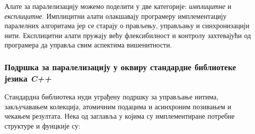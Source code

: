 \documentclass[12pt,oneside]{memoir}
\begin{document}
 Алате за паралелизацију можемо поделити у две категорије: \textit{имплицитне} и \textit{експлицитне}. Имплицитни алати олакшавају програмеру имплементацију паралелних алгоритама јер се старају о прављењу, управљању и синхронизацији нити. Експлицитни алати пружају већу флексибилност и контролу захтевајући од програмера да управља свим аспектима вишенитности.
\subsubsection*{Подршка за паралелизацију у оквиру стандардне библиотеке језика \textit{C++}}

Стандардна библиотека нуди уграђену подршку за управљање нитима, закључавањем колекција, атомичним подацима и асинхроним позивањем и чекањем резултата. Нека од заглавља у којима су имплементиране потребне структуре и фунцкије су:
\end{document}
